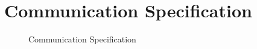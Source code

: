 \section{Communication Specification}
\label{sec:Communication Specification}
\begin{figure}[H]
	\centering
	\caption{Communication Specification}
	\label{fig:Communication Specification}
\end{figure}